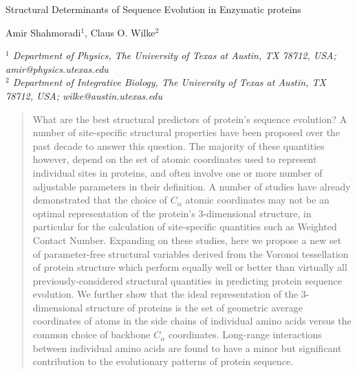 \documentclass[11pt]{article}
\makeatletter
\newcommand\pubnumber{}
\newcommand\pubdate{\today}
\def\affiliation{$^1$ Department of Physics, The University of Texas at Austin, TX 78712, USA; amir@physics.utexas.edu \\
                 $^2$ Department of Integrative Biology, The University of Texas at Austin, TX 78712, USA; wilke@austin.utexas.edu
                 }
\def\Title#1{\begin{center} {\Large #1 } \end{center}}
\def\Author#1{\begin{center}{ \sc #1} \end{center}}
\def\Address#1{\begin{center}{ \it #1} \end{center}}
\newcommand\pubblock{\rightline{\begin{tabular}{l} \pubnumber\\
         \pubdate  \end{tabular}}}
\newenvironment{Abstract}{\begin{quotation}  }{\end{quotation}}
\makeatother
\begin{document}
\begin{titlepage}
\pubblock

\vfill
\Title{Structural Determinants of Sequence Evolution in Enzymatic proteins}
\vfill
\Author{Amir Shahmoradi$^{1}$, Claus O. Wilke$^2$}
\Address{\affiliation}
\vfill
\begin{Abstract}
    What are the best structural predictors of protein's sequence evolution? A number of site-specific structural properties have been proposed over the past decade to answer this question. The majority of these quantities however, depend on the set of atomic coordinates used to represent individual sites in proteins, and often involve one or more number of adjustable parameters in their definition. A number of studies have already demonstrated that the choice of $C_\alpha$ atomic coordinates may not be an optimal representation of the protein's 3-dimensional structure, in particular for the calculation of site-specific quantities such as Weighted Contact Number.  Expanding on these studies, here we propose a new set of parameter-free structural variables derived from the Voronoi tessellation of protein structure which perform equally well or better than virtually all previously-considered structural quantities in predicting protein sequence evolution. We further show that the ideal representation of the 3-dimensional structure of proteins is the set of geometric average coordinates of atoms in the side chains of individual amino acids versus the common choice of backbone $C_\alpha$ coordinates. Long-range interactions between individual amino acids are found to have a minor but significant contribution to the evolutionary patterns of protein sequence.

\end{Abstract}
\end{titlepage}
\end{document}
